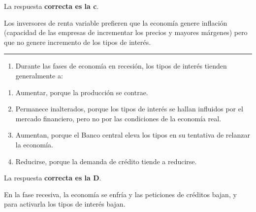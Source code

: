 \documentclass[
  letterpaper,
  DIV=11,
  numbers=noendperiod]{scrreprt}
\providecommand{\tightlist}{%
  \setlength{\itemsep}{0pt}\setlength{\parskip}{0pt}}\usepackage{longtable,booktabs,array}
\begin{document}
\begin{tcolorbox}[enhanced jigsaw, left=2mm, opacityback=0, colback=white, breakable, arc=.35mm, bottomrule=.15mm, rightrule=.15mm, toprule=.15mm, leftrule=.75mm, colframe=quarto-callout-tip-color-frame]
\begin{minipage}[t]{5.5mm}
\textcolor{quarto-callout-tip-color}{\faLightbulb}
\end{minipage}%
\begin{minipage}[t]{\textwidth - 5.5mm}

La respuesta \textbf{correcta es la c}.

Los inversores de renta variable prefieren que la economía genere
inflación (capacidad de las empresas de incrementar los precios y
mayores márgenes) pero que no genere incremento de los tipos de interés.

\end{minipage}%
\end{tcolorbox}

\begin{center}\rule{0.5\linewidth}{0.5pt}\end{center}

\begin{enumerate}
\def\labelenumi{\arabic{enumi}.}
\setcounter{enumi}{44}
\tightlist
\item
  Durante las fases de economía en recesión, los tipos de interés
  tienden generalmente a:
\end{enumerate}

\begin{enumerate}
\def\labelenumi{\alph{enumi})}
\item
  Aumentar, porque la producción se contrae.
\item
  Permanece inalterados, porque los tipos de interés se hallan influidos
  por el mercado financiero, pero no por las condiciones de la economía
  real.
\item
  Aumentan, porque el Banco central eleva los tipos en su tentativa de
  relanzar la economía.
\item
  Reducirse, porque la demanda de crédito tiende a reducirse.
\end{enumerate}

\begin{tcolorbox}[enhanced jigsaw, left=2mm, opacityback=0, colback=white, breakable, arc=.35mm, bottomrule=.15mm, rightrule=.15mm, toprule=.15mm, leftrule=.75mm, colframe=quarto-callout-tip-color-frame]
\begin{minipage}[t]{5.5mm}
\textcolor{quarto-callout-tip-color}{\faLightbulb}
\end{minipage}%
\begin{minipage}[t]{\textwidth - 5.5mm}

La respuesta \textbf{correcta es la D}.

En la fase recesiva, la economía se enfría y las peticiones de créditos
bajan, y para activarla los tipos de interés bajan.

\end{minipage}%
\end{tcolorbox}
\end{document}
